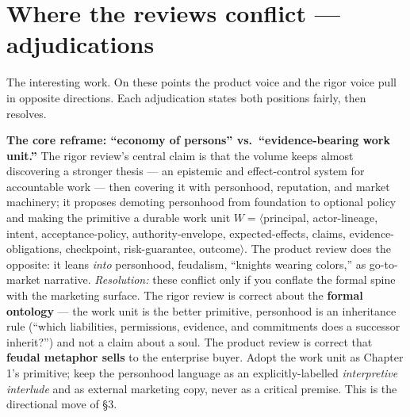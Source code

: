 \documentclass[11pt,a4paper]{article}
\begin{document}
\section{Where the reviews conflict --- adjudications}
The interesting work. On these points the product voice and the rigor voice pull in opposite directions. Each adjudication states both positions fairly, then resolves.

\begin{adj}\textbf{The core reframe: ``economy of persons'' vs.\ ``evidence-bearing work unit.''} The rigor review's central claim is that the volume keeps almost discovering a stronger thesis --- an epistemic and effect-control system for accountable work --- then covering it with personhood, reputation, and market machinery; it proposes demoting personhood from foundation to optional policy and making the primitive a durable work unit $W = \langle$principal, actor-lineage, intent, acceptance-policy, authority-envelope, expected-effects, claims, evidence-obligations, checkpoint, risk-guarantee, outcome$\rangle$. The product review does the opposite: it leans \emph{into} personhood, feudalism, ``knights wearing colors,'' as go-to-market narrative. \emph{Resolution:} these conflict only if you conflate the formal spine with the marketing surface. The rigor review is correct about the \textbf{formal ontology} --- the work unit is the better primitive, personhood is an inheritance rule (``which liabilities, permissions, evidence, and commitments does a successor inherit?'') and not a claim about a soul. The product review is correct that \textbf{feudal metaphor sells} to the enterprise buyer. Adopt the work unit as Chapter 1's primitive; keep the personhood language as an explicitly-labelled \emph{interpretive interlude} and as external marketing copy, never as a critical premise. This is the directional move of \S3.
\end{adj}
\end{document}
